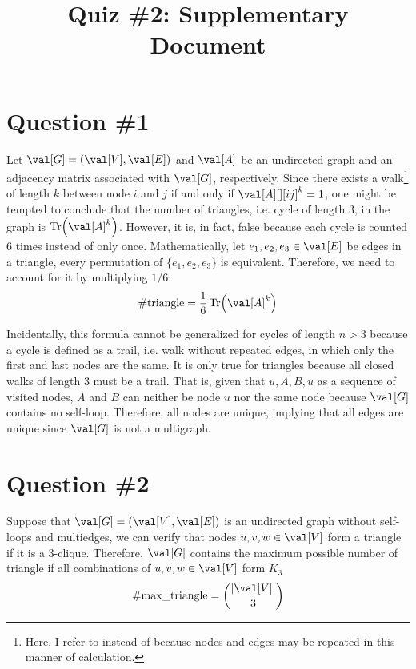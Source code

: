 

\title{Quiz \#2: Supplementary Document}

\section{Question \#1}
Let $\val[G]=(\val[V],\val[E])$ and $\val[A]$ be an undirected graph and an adjacency matrix associated with $\val[G]$, respectively. Since there exists a walk\footnote{Here, I refer to  instead of  because nodes and edges may be repeated in this manner of calculation.} of length $k$ between node $i$ and $j$ if and only if $\val[A][][ij]^k = 1$, one might be tempted to conclude that the number of triangles, i.e. cycle of length $3$, in the graph is $\Tr\parens*{\val[A]^k}$. However, it is, in fact, false because each cycle is counted 6 times instead of only once. Mathematically, let $e_1, e_2, e_3 \in \val[E]$ be edges in a triangle, every permutation of $\{e_1,e_2,e_3\}$ is equivalent. Therefore, we need to account for it by multiplying $1/6$:
\begin{equation}
    \text{\#triangle} = \frac{1}{6} \Tr\parens*{\val[A]^k}
\end{equation}

Incidentally, this formula cannot be generalized for cycles of length $n>3$ because a cycle is defined as a trail, i.e. walk without repeated edges, in which only the first and last nodes are the same. It is only true for triangles because all closed walks of length $3$ must be a trail. That is, given that $u,A,B,u$ as a sequence of visited nodes, $A$ and $B$ can neither be node $u$ nor the same node because $\val[G]$ contains no self-loop. Therefore, all nodes are unique, implying that all edges are unique since $\val[G]$ is not a multigraph.

\section{Question \#2}
Suppose that $\val[G]=(\val[V],\val[E])$ is an undirected graph without self-loops and multiedges, we can verify that nodes $u,v,w \in \val[V]$ form a triangle if it is a 3-clique. Therefore, $\val[G]$ contains the maximum possible number of triangle if all combinations of $u,v,w \in \val[V]$ form $K_3$
\begin{equation}
    \text{\#max\_triangle} = \genfrac(){0pt}{0}{\abs{\val[V]}}{3}
\end{equation}


